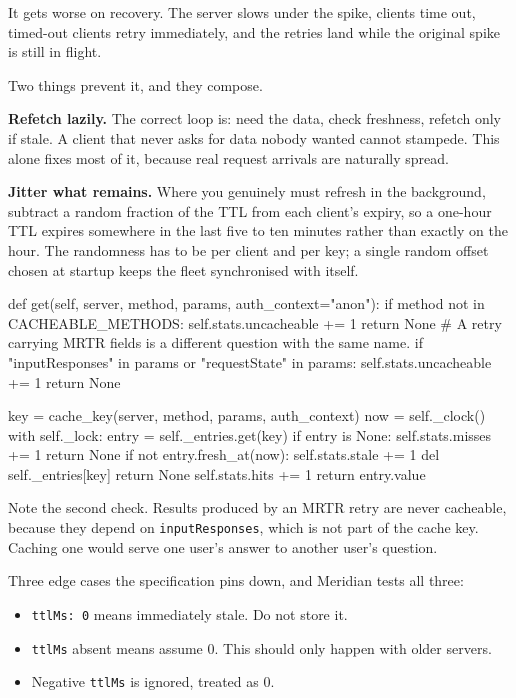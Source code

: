 It gets worse on recovery. The server slows under the spike, clients time out,
timed-out clients retry immediately, and the retries land while the original
spike is still in flight.

Two things prevent it, and they compose.

\textbf{Refetch lazily.} The correct loop is: need the data, check freshness,
refetch only if stale. A client that never asks for data nobody wanted cannot
stampede. This alone fixes most of it, because real request arrivals are
naturally spread.

\textbf{Jitter what remains.} Where you genuinely must refresh in the
background, subtract a random fraction of the TTL from each client's expiry, so
a one-hour TTL expires somewhere in the last five to ten minutes rather than
exactly on the hour. The randomness has to be per client and per key; a single
random offset chosen at startup keeps the fleet synchronised with itself.

\begin{py}
def get(self, server, method, params, auth_context="anon"):
    if method not in CACHEABLE_METHODS:
        self.stats.uncacheable += 1
        return None
    # A retry carrying MRTR fields is a different question with the same name.
    if "inputResponses" in params or "requestState" in params:
        self.stats.uncacheable += 1
        return None

    key = cache_key(server, method, params, auth_context)
    now = self._clock()
    with self._lock:
        entry = self._entries.get(key)
        if entry is None:
            self.stats.misses += 1
            return None
        if not entry.fresh_at(now):
            self.stats.stale += 1
            del self._entries[key]
            return None
        self.stats.hits += 1
        return entry.value
\end{py}

Note the second check. Results produced by an MRTR retry are never cacheable,
because they depend on \texttt{inputResponses}, which is not part of the cache
key. Caching one would serve one user's answer to another user's question.

Three edge cases the specification pins down, and Meridian tests all three:

\begin{itemize}[leftmargin=1.6em, itemsep=3pt]
\item \texttt{ttlMs: 0} means immediately stale. Do not store it.
\item \texttt{ttlMs} absent means assume 0. This should only happen with older
servers.
\item Negative \texttt{ttlMs} is ignored, treated as 0.
\end{itemize}

